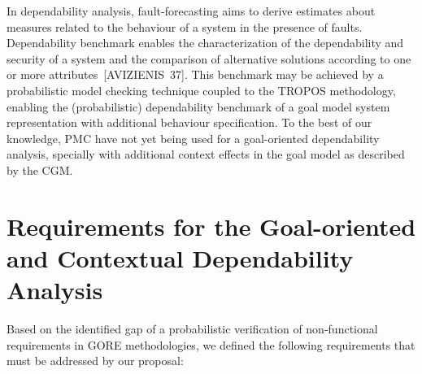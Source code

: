 In dependability analysis, fault-forecasting aims to derive estimates about measures related to the behaviour of a system in the presence of faults. Dependability benchmark enables the characterization of the dependability and security of a system and the comparison of alternative solutions according to one or more attributes~[AVIZIENIS~37]. This benchmark may be achieved by a probabilistic model checking technique coupled to the TROPOS methodology, enabling the (probabilistic) dependability benchmark of a goal model system representation with additional behaviour specification. To the best of our knowledge, PMC have not yet being used for a goal-oriented dependability analysis, specially with additional context effects in the goal model as described by the CGM.


\section{Requirements for the Goal-oriented and Contextual Dependability Analysis}

Based on the identified gap of a probabilistic verification of non-functional requirements in GORE methodologies, we defined the following requirements that must be addressed by our proposal:

